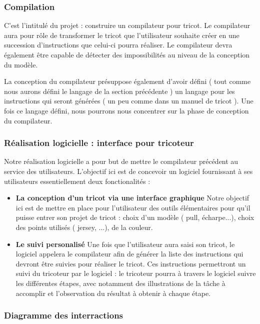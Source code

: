 \documentclass{article}
\begin{document}
\subsubsection{Compilation}

C'est l'intitulé du projet : construire un compilateur pour tricot. Le compilateur aura pour rôle de transformer le tricot que 
l'utilisateur souhaite créer en une succession d'instructions que celui-ci pourra réaliser. Le compilateur devra également être capable de 
détecter des impossibilités au niveau de la conception du modèle.

La conception du compilateur présuppose également d'avoir défini ( tout comme nous aurons défini le langage de la section précédente ) un 
langage pour les instructions qui seront générées ( un peu comme dans un manuel de tricot ). 
Une fois ce langage défini, nous pourrons nous concentrer sur la phase de conception du compilateur. 

\subsubsection{Réalisation logicielle : interface pour tricoteur}

Notre réalisation logicielle a pour but de mettre le compilateur précédent au service des utilisateurs. 
L'objectif ici est de concevoir un logiciel fournissant à ses utilisateurs essentiellement deux fonctionalités :
\begin{itemize} 
  \item \textbf{La conception d'un tricot via une interface graphique} Notre objectif ici est de mettre en place pour l'utilisateur des
  outils élémentaires pour qu'il puisse entrer son projet de tricot : choix d'un modèle ( pull, écharpe...), choix des points utilisés 
  ( jersey, ...), de la couleur.
  \item \textbf{Le suivi personalisé} Une fois que l'utilisateur aura saisi son tricot, le logiciel appelera le compilateur afin de générer 
la liste des instructions qui devront être suivies pour réaliser le tricot. Ces instructions permettront un suivi du tricoteur par le 
logiciel : le tricoteur pourra à travers le logiciel suivre les différentes étapes, avec notamment des illustrations de la tâche à 
accomplir et l'observation du résultat à obtenir à chaque étape.
\end{itemize}

\subsubsection{Diagramme des interractions}
\end{document}
